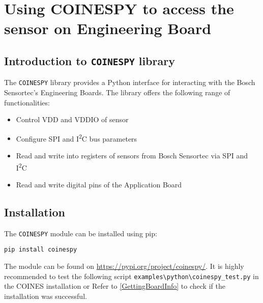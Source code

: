 \documentclass{article}
\begin{document}
\section{Using COINESPY to access the sensor on Engineering Board}

\subsection{Introduction to \texttt{COINESPY} library}

The \texttt{COINESPY} library provides a Python interface for interacting with the Bosch Sensortec's Engineering Boards. 
\newline \newline The library offers the following range of functionalities:
\begin{itemize}
	\item Control VDD and VDDIO of sensor
	\item Configure SPI and I\textsuperscript{2}C bus parameters
	\item Read and write into registers of sensors from Bosch Sensortec via SPI and I\textsuperscript{2}C
	\item Read and write digital pins of the Application Board
\end{itemize}

\subsection{Installation}

The \texttt{COINESPY} module can be installed using pip:
\begin{lstlisting}
pip install coinespy
\end{lstlisting}
The module can be found on \url{https://pypi.org/project/coinespy/}.
It is highly recommended to test the following script \texttt{examples\textbackslash python\textbackslash coinespy\_test.py}  in the COINES installation or Refer to \ref{GettingBoardInfo} to check if the installation was successful.

\newpage
\end{document}
